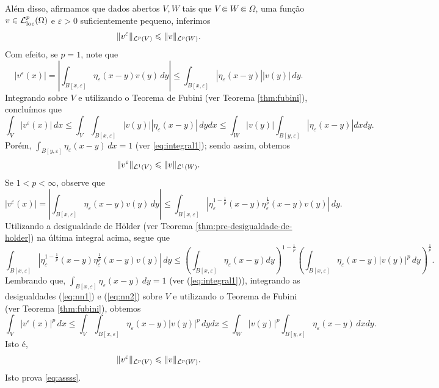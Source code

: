\begin{prf}
    Além disso, afirmamos que dados abertos $V, W$ tais que $V \Subset W \Subset \Omega$, uma função $v \in \mathcal{L}^p_{\mathrm{loc}}(\Omega)$ e $\varepsilon > 0$ suficientemente pequeno, inferimos
    \begin{equation} \label{eq:assss}
        \Vert v^\varepsilon \Vert_{\mathcal{L}^p(V)} \leqslant \Vert v \Vert_{\mathcal{L}^p(W)}.
    \end{equation}
    Com efeito, se $p = 1$, note que
    \[
        |v^\varepsilon(x)| =  \left| \int_{B[x,\varepsilon]} \eta_\varepsilon (x-y) v(y) \,dy \right| \leqslant \int_{B[x,\varepsilon]} |\eta_\varepsilon(x-y)| | v(y)| \,dy.
    \]
    Integrando sobre $V$ e utilizando o Teorema de Fubini (ver Teorema \ref{thm:fubini}), concluímos que
    \[
        \int_V |v^\varepsilon(x)| \,dx \leqslant \int_V  \int_{B[x,\varepsilon]} |v(y)||\eta_\varepsilon(x-y)| \, dydx \leqslant \int_W |v(y)| \int_{B[y,\varepsilon]} |\eta_\varepsilon (x-y)| dxdy.
    \]
    Porém, $\int_{B[y,\varepsilon]} \eta_\varepsilon(x- y) \,dx = 1$ (ver \ref{eq:integral1}); sendo assim, obtemos
    \[
        \Vert v^\varepsilon \Vert_{\mathcal{L}^1(V)} \leqslant \Vert v \Vert_{\mathcal{L}^1(W)}.
    \]
    Se $1 < p < \infty$, observe que
    \begin{equation} \label{eq:nn1}
        |v^\varepsilon(x)| = \left| \int_{B[x,\varepsilon]} \eta_\varepsilon(x-y) v(y) \,dy \right| \leqslant \int_{B[x,\varepsilon]} \left| \eta_\varepsilon^{1 - \frac{1}{p}} (x-y) \eta_\varepsilon^{\frac{1}{p}} (x-y) v(y) \right| \,dy.
    \end{equation}
    Utilizando a desigualdade de Hölder (ver Teorema \ref{thm:pre-desigualdade-de-holder}) na última integral acima, segue que
    {\small
        \begin{equation} \label{eq:nn2}
            \int_{B[x,\varepsilon]} \left| \eta_\varepsilon^{1 - \frac{1}{p}} (x-y) \eta_\varepsilon^{\frac{1}{p}} (x-y) v(y) \right| \,dy \leqslant \left( \int_{B[x,\varepsilon]} \eta_\varepsilon(x-y) dy \right)^{1 - \frac{1}{p}} \left( \int_{B[x,\varepsilon]} \eta_\varepsilon(x-y) |v(y)|^p \,dy \right)^{\frac{1}{p}}.
        \end{equation}
    }\!\!
    Lembrando que, $\int_{B[x,\varepsilon]} \eta_\varepsilon(x-y) \,dy = 1$ (ver (\ref{eq:integral1})), integrando  as desigualdades (\ref{eq:nn1}) e (\ref{eq:nn2}) sobre $V$ e utilizando o Teorema de Fubini (ver Teorema \ref{thm:fubini}), obtemos
    \[
        \int_V |v^\varepsilon(x)|^p \,dx \leqslant \int_V \int_{B[x,\varepsilon]} \eta_\varepsilon(x-y) |v(y)|^p \,dy dx \leqslant \int_W |v(y)|^p \int_{B[y,\varepsilon]} \eta_\varepsilon(x-y) \,dxdy.
    \]
    Isto é,
    \begin{equation*}
        \Vert v^\varepsilon \Vert_{\mathcal{L}^p(V)} \leqslant \Vert v \Vert_{\mathcal{L}^p(W)}.
    \end{equation*}
    Isto prova \ref{eq:assss}.


\end{prf}
